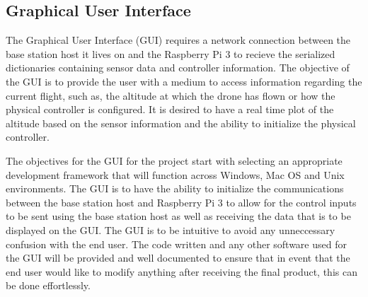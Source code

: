 \subsection{Graphical User Interface}


The Graphical User Interface (GUI) requires a network connection between the base station host it lives on and the Raspberry Pi 3 to recieve the serialized dictionaries containing sensor data and controller information. The objective of the GUI is to provide the user with a medium to access information regarding the current flight, such as, the altitude at which the drone has flown or how the physical controller is configured. It is desired to have a real time plot of the altitude based on the sensor information and the ability to initialize the physical controller. 

The objectives for the GUI for the project start with selecting an appropriate development framework that will function across Windows, Mac OS and Unix environments.  The GUI is to have the ability to initialize the communications between the base station host and Raspberry Pi 3 to allow for the control inputs to be sent using the base station host as well as receiving the data that is to be displayed on the GUI. The GUI is to be intuitive to avoid any unneccessary confusion with the end user. The code written and any other software used for the GUI will be provided and well documented to ensure that in event that the end user would like to modify anything after receiving the final product, this can be done effortlessly. 
  
